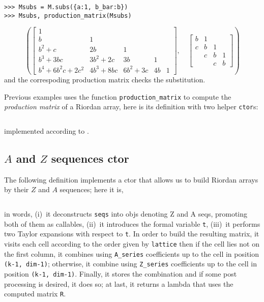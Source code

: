 \begin{example}
\begin{verbatim}
>>> Msubs = M.subs({a:1, b_bar:b})
>>> Msubs, production_matrix(Msubs)
\end{verbatim}
\begin{displaymath}
\left ( \left[\begin{matrix}1 &   &   &   &  \\b & 1 &   &   &  \\b^{2} + c & 2 b & 1 &   &  \\b^{3} + 3 b c & 3 b^{2} + 2 c & 3 b & 1 &  \\b^{4} + 6 b^{2} c + 2 c^{2} & 4 b^{3} + 8 b c & 6 b^{2} + 3 c & 4 b & 1\end{matrix}\right], \quad \left[\begin{matrix}b & 1 &   &  \\c & b & 1 &  \\  & c & b & 1\\  &   & c & b\end{matrix}\right]\right )
\end{displaymath}
and the correspoding production matrix checks the substitution.
\end{example}

Previous examples uses the function \verb|production_matrix| to compute the
\textit{production matrix} \citep{DEUTSCH2005101,Deutsch2009} of a Riordan
array, here is its definition with two helper \verb|ctor|s:

\inputminted[baselinestretch=0.8,stripnl=false,firstline=159, lastline=180]{python}{deps/simulation-methods/src/sequences.py}

\noindent implemented according to \citep[page~$215$]{barry2017riordan}.

\subsection{$A$ and $Z$ sequences ctor}

The following definition implements a ctor that allows us to build Riordan
arrays by their $Z$ and $A$ sequences; here it is,
\inputminted[baselinestretch=0.8,stripnl=false,firstline=47, lastline=78]
    {python}{deps/simulation-methods/src/sequences.py}
in words, (i)~it deconstructs \verb|seqs| into objs denoting Z and A seqs,
promoting both of them as callables, (ii)~it introduces the formal variable \verb|t|,
(iii)~it performs two Taylor expansions with respect to \verb|t|.
In order to build the resulting matrix, it
visits each cell according to the order given by \verb|lattice| then
if the cell lies not on the first column, it combines using \verb|A_series| coefficients
up to the cell in position \verb|(k-1, dim-1)|;
otherwise, %
it combine using \verb|Z_series| coefficients up to the cell in position
\verb|(k-1, dim-1)|. Finally, it stores the combination and
if some post processing is desired, it does so; at last,
it returns a lambda that uses the computed matrix \verb|R|.


